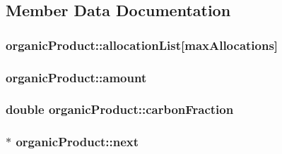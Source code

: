 \subsection{Member Data Documentation}
\hypertarget{classorganic_product_a1009688debdb12952259390ce6b761ad}{
\subsubsection[{allocationList}]{ {\bf organicProduct::allocationList}\mbox{[}maxAllocations\mbox{]}}}
\label{classorganic_product_a1009688debdb12952259390ce6b761ad}
\hypertarget{classorganic_product_a1eba4729932fc4050b9a32c848f22248}{
\subsubsection[{amount}]{ {\bf organicProduct::amount}}}
\label{classorganic_product_a1eba4729932fc4050b9a32c848f22248}
\hypertarget{classorganic_product_abf93f684bb0111a45f3682fa96d9c738}{
\subsubsection[{carbonFraction}]{\setlength{\rightskip}{0pt plus 5cm}double {\bf organicProduct::carbonFraction}}}
\label{classorganic_product_abf93f684bb0111a45f3682fa96d9c738}
\hypertarget{classorganic_product_a1fd373bd20bdba2e2637c3550f20af52}{
\subsubsection[{next}]{$\ast$ {\bf organicProduct::next}}}
